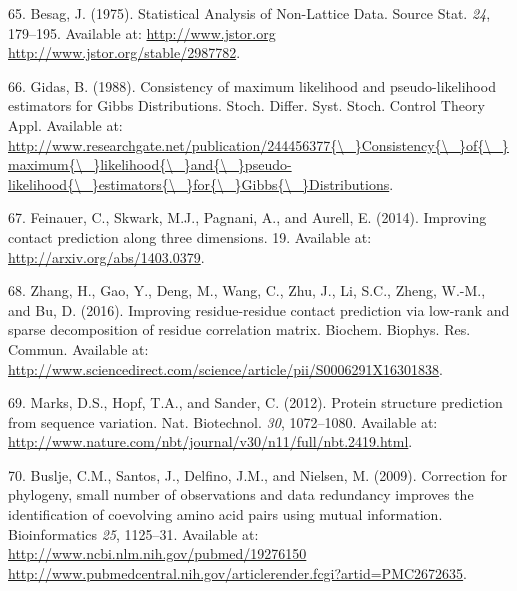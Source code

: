 \documentclass[12pt,a4paper,twoside]{book}
\theoremstyle{definition}
\theoremstyle{definition}
\theoremstyle{remark}
\begin{document}
\hypertarget{ref-Besag1975}{}
65. Besag, J. (1975). Statistical Analysis of Non-Lattice Data. Source
Stat. \emph{24}, 179--195. Available at:
\href{http://www.jstor.org\%20http://www.jstor.org/stable/2987782}{http://www.jstor.org http://www.jstor.org/stable/2987782}.

\hypertarget{ref-Gidas1988}{}
66. Gidas, B. (1988). Consistency of maximum likelihood and
pseudo-likelihood estimators for Gibbs Distributions. Stoch. Differ.
Syst. Stoch. Control Theory Appl. Available at:
\href{http://www.researchgate.net/publication/244456377\%7B/_\%7DConsistency\%7B/_\%7Dof\%7B/_\%7Dmaximum\%7B/_\%7Dlikelihood\%7B/_\%7Dand\%7B/_\%7Dpseudo-likelihood\%7B/_\%7Destimators\%7B/_\%7Dfor\%7B/_\%7DGibbs\%7B/_\%7DDistributions}{http://www.researchgate.net/publication/244456377\{\textbackslash{}\_\}Consistency\{\textbackslash{}\_\}of\{\textbackslash{}\_\}maximum\{\textbackslash{}\_\}likelihood\{\textbackslash{}\_\}and\{\textbackslash{}\_\}pseudo-likelihood\{\textbackslash{}\_\}estimators\{\textbackslash{}\_\}for\{\textbackslash{}\_\}Gibbs\{\textbackslash{}\_\}Distributions}.

\hypertarget{ref-Feinauer2014}{}
67. Feinauer, C., Skwark, M.J., Pagnani, A., and Aurell, E. (2014).
Improving contact prediction along three dimensions. 19. Available at:
\url{http://arxiv.org/abs/1403.0379}.

\hypertarget{ref-Zhang2016}{}
68. Zhang, H., Gao, Y., Deng, M., Wang, C., Zhu, J., Li, S.C., Zheng,
W.-M., and Bu, D. (2016). Improving residue-residue contact prediction
via low-rank and sparse decomposition of residue correlation matrix.
Biochem. Biophys. Res. Commun. Available at:
\url{http://www.sciencedirect.com/science/article/pii/S0006291X16301838}.

\hypertarget{ref-Marks2012}{}
69. Marks, D.S., Hopf, T.A., and Sander, C. (2012). Protein structure
prediction from sequence variation. Nat. Biotechnol. \emph{30},
1072--1080. Available at:
\url{http://www.nature.com/nbt/journal/v30/n11/full/nbt.2419.html}.

\hypertarget{ref-Buslje2009}{}
70. Buslje, C.M., Santos, J., Delfino, J.M., and Nielsen, M. (2009).
Correction for phylogeny, small number of observations and data
redundancy improves the identification of coevolving amino acid pairs
using mutual information. Bioinformatics \emph{25}, 1125--31. Available
at:
\href{http://www.ncbi.nlm.nih.gov/pubmed/19276150\%20http://www.pubmedcentral.nih.gov/articlerender.fcgi?artid=PMC2672635}{http://www.ncbi.nlm.nih.gov/pubmed/19276150 http://www.pubmedcentral.nih.gov/articlerender.fcgi?artid=PMC2672635}.
\end{document}
